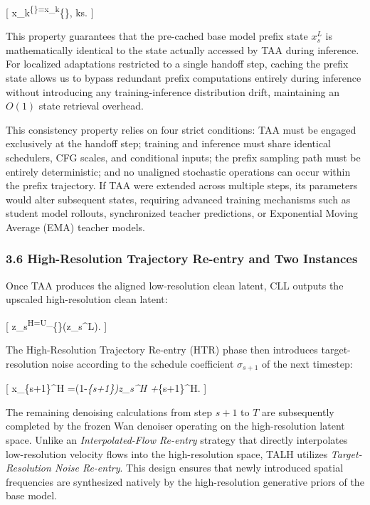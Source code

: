 {[} x\_k\textsuperscript{\{\}=x\_k}\{\}, \qquad \forall k\leq s. {]}

This property guarantees that the pre-cached base model prefix state \(x_s^L\) is mathematically identical to the state actually accessed by TAA during inference. For localized adaptations restricted to a single handoff step, caching the prefix state allows us to bypass redundant prefix computations entirely during inference without introducing any training-inference distribution drift, maintaining an \(O(1)\) state retrieval overhead.

This consistency property relies on four strict conditions: TAA must be engaged exclusively at the handoff step; training and inference must share identical schedulers, CFG scales, and conditional inputs; the prefix sampling path must be entirely deterministic; and no unaligned stochastic operations can occur within the prefix trajectory. If TAA were extended across multiple steps, its parameters would alter subsequent states, requiring advanced training mechanisms such as student model rollouts, synchronized teacher predictions, or Exponential Moving Average (EMA) teacher models.

\hypertarget{high-resolution-trajectory-re-entry-and-two-instances}{%
\subsubsection{3.6 High-Resolution Trajectory Re-entry and Two Instances}\label{high-resolution-trajectory-re-entry-and-two-instances}}

Once TAA produces the aligned low-resolution clean latent, CLL outputs the upscaled high-resolution clean latent:

{[} \widehat z\_s\textsuperscript{H=U\_\psi}\{\}(\widetilde z\_s\^{}L). {]}

The High-Resolution Trajectory Re-entry (HTR) phase then introduces target-resolution noise according to the schedule coefficient \(\sigma_{s+1}\) of the next timestep:

{[} x\_\{s+1\}\^{}H =(1-\sigma\emph{\{s+1\})\widehat z\_s\^{}H +\sigma}\{s+1\}\epsilon\^{}H. {]}

The remaining denoising calculations from step \(s+1\) to \(T\) are subsequently completed by the frozen Wan denoiser operating on the high-resolution latent space. Unlike an \emph{Interpolated-Flow Re-entry} strategy that directly interpolates low-resolution velocity flows into the high-resolution space, TALH utilizes \emph{Target-Resolution Noise Re-entry}. This design ensures that newly introduced spatial frequencies are synthesized natively by the high-resolution generative priors of the base model.


